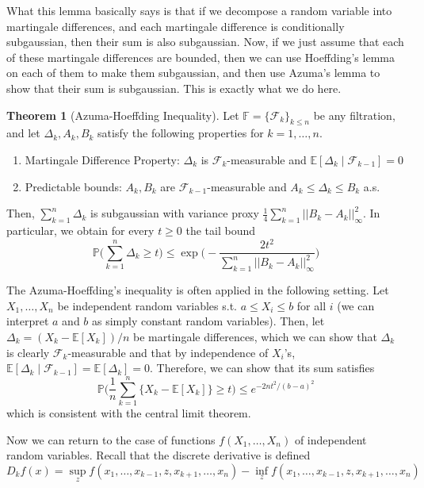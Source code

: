 \documentclass{article}
\theoremstyle{definition}
\newtheorem{theorem}{Theorem}[section]
\theoremstyle{remark}
\theoremstyle{definition}
\begin{document}
What this lemma basically says is that if we decompose a random variable into martingale differences, and each martingale difference is conditionally subgaussian, then their sum is also subgaussian. Now, if we just assume that each of these martingale differences are bounded, then we can use Hoeffding's lemma on each of them to make them subgaussian, and then use Azuma's lemma to show that their sum is subgaussian. This is exactly what we do here. 

\begin{theorem}[Azuma-Hoeffding Inequality]
Let $\mathbb{F} = \{ \mathcal{F}_k \}_{k \leq n}$ be any filtration, and let $\Delta_k, A_k, B_k$ satisfy the following properties for $k = 1, \ldots, n$. 
\begin{enumerate}
    \item Martingale Difference Property: $\Delta_k$ is $\mathcal{F}_k$-measurable and $\mathbb{E}[\Delta_k \mid \mathcal{F}_{k-1}] = 0$ 
    \item Predictable bounds: $A_k, B_k$ are $\mathcal{F}_{k-1}$-measurable and $A_k \leq \Delta_k \leq B_k$ a.s. 
\end{enumerate}
Then, $\sum_{k=1}^n \Delta_k$ is subgaussian with variance proxy $\frac{1}{4} \sum_{k=1}^n ||B_k - A_k||^2_\infty$. In particular, we obtain for every $t \geq 0$ the tail bound 
\[\mathbb{P} \bigg( \sum_{k=1}^n \Delta_k \geq t \bigg) \leq \exp \bigg( - \frac{2t^2}{\sum_{k=1}^n ||B_k - A_k||_\infty^2} \bigg)\]
\end{theorem}

The Azuma-Hoeffding's inequality is often applied in the following setting. Let $X_1, \ldots, X_n$ be independent random variables s.t. $a \leq X_i \leq b$ for all $i$ (we can interpret $a$ and $b$ as simply constant random variables). Then, let $\Delta_k = (X_k - \mathbb{E}[X_k])/n$ be martingale differences, which we can show that $\Delta_k$ is clearly $\mathcal{F}_k$-measurable and that by independence of $X_i$'s,  $\mathbb{E}[\Delta_k \mid \mathcal{F}_{k-1}] = \mathbb{E}[\Delta_k] = 0$. Therefore, we can show that its sum satisfies
\[\mathbb{P} \bigg( \frac{1}{n} \sum_{k=1}^n \{X_k - \mathbb{E}[X_k]\} \geq t \bigg) \leq e^{-2n t^2 / (b - a)^2}\]
which is consistent with the central limit theorem. 

Now we can return to the case of functions $f(X_1, \ldots, X_n)$ of independent random variables. Recall that the discrete derivative is defined 
\[D_k f(x) = \sup_z f(x_1, \ldots, x_{k-1}, z, x_{k+1}, \ldots, x_n) - \inf_z f(x_1, \ldots, x_{k-1}, z, x_{k+1}, \ldots, x_n)\]
\end{document}
